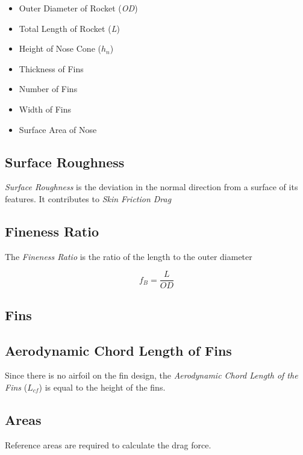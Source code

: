 \documentclass[]{book}
\providecommand{\tightlist}{%
  \setlength{\itemsep}{0pt}\setlength{\parskip}{0pt}}
\begin{document}
\begin{itemize}
\tightlist
\item
  Outer Diameter of Rocket (\emph{OD})
\item
  Total Length of Rocket (\emph{L})
\item
  Height of Nose Cone (\(h_n\))
\item
  Thickness of Fins
\item
  Number of Fins
\item
  Width of Fins
\item
  Surface Area of Nose
\end{itemize}

\subsection{Surface Roughness}\label{surface-roughness}

\emph{Surface Roughness} is the deviation in the normal direction from a
surface of its features. It contributes to \emph{Skin Friction Drag}

\subsection{Fineness Ratio}\label{fineness-ratio}

The \emph{Fineness Ratio} is the ratio of the length to the outer
diameter

\begin{equation} 
f_B = \dfrac{L} {OD}
\end{equation}

\subsection{Fins}\label{fins-1}

\subsection{Aerodynamic Chord Length of
Fins}\label{aerodynamic-chord-length-of-fins}

Since there is no airfoil on the fin design, the \emph{Aerodynamic Chord
Length of the Fins} (\(L_{cf}\)) is equal to the height of the fins.

\subsection{Areas}\label{areas}

Reference areas are required to calculate the drag force.
\end{document}
